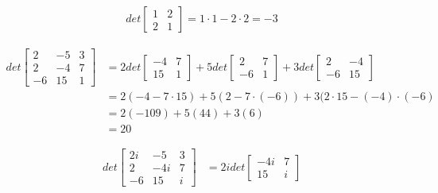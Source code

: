 \documentclass[11pt, a4paper, norsk]{NTNUoving}
\begin{document}
\begin{oppgave}[1]
    \begin{punkt}
        \begin{align*}
            det\begin{bmatrix}
            1 & 2 \\
            2 & 1
            \end{bmatrix}
            =1\cdot 1 -2\cdot 2 = -3
        \end{align*}
    \end{punkt}
    \begin{punkt}
        \begin{align*}
            det\begin{bmatrix}
            2 & -5 & 3\\
            2 & -4 & 7\\
            -6 & 15 & 1
            \end{bmatrix}
            &=2det\begin{bmatrix}
            -4 & 7\\
            15 & 1
            \end{bmatrix}
            +5det\begin{bmatrix}
            2 & 7\\
            -6 & 1
            \end{bmatrix}
            +3det\begin{bmatrix}
            2 & -4\\
            -6 & 15
            \end{bmatrix}
            \\&=2(-4-7\cdot 15) +5(2-7\cdot (-6)) +3(2\cdot 15 -(-4)\cdot (-6)
            \\&=2(-109)+5(44)+3(6)
            \\&=20
        \end{align*}
    \end{punkt}
    \begin{punkt}
        \begin{align*}
            det\begin{bmatrix}
            2i & -5 & 3\\
            2 & -4i & 7\\
            -6 & 15 & i
            \end{bmatrix}
            &=2idet\begin{bmatrix}
            -4i & 7\\
            15 & i
            \end{bmatrix}

\end{align*}
\end{punkt}
\end{oppgave}
\end{document}
